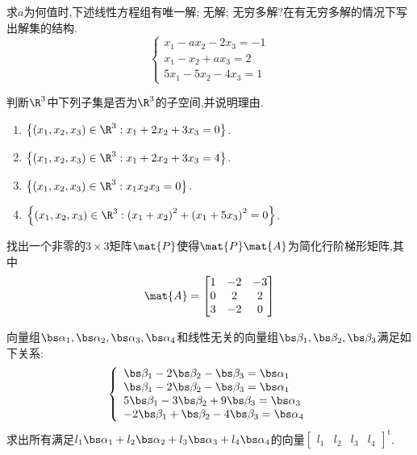 \documentclass{ctexart}
\begin{document}
\pagestyle{empty}
\begin{center}
\end{center}
\begin{homework}[1(20')]
    求$a$为何值时,下述线性方程组有唯一解; 无解; 无穷多解?在有无穷多解的情况下写出解集的结构.
    \[\left\{\begin{array}{l}
        x_1-ax_2-2x_3=-1\\
        x_1-x_2+ax_3=2\\
        5x_1-5x_2-4x_3=1
    \end{array}\right.\]
\end{homework}
\begin{homework}[2(10')]
    判断$\R^3$中下列子集是否为$\R^3$的子空间,并说明理由.
    \begin{enumerate}[label=\tbf{(\arabic*)},topsep=0pt,parsep=0pt,itemsep=0pt,partopsep=0pt]
        \item $\left\{\left(x_1,x_2,x_3\right)\in\R^3:x_1+2x_2+3x_3=0\right\}$.
        \item $\left\{\left(x_1,x_2,x_3\right)\in\R^3:x_1+2x_2+3x_3=4\right\}$.
        \item $\left\{\left(x_1,x_2,x_3\right)\in\R^3:x_1x_2x_3=0\right\}$.
        \item $\left\{\left(x_1,x_2,x_3\right)\in\R^3:\left(x_1+x_2\right)^2+\left(x_1+5x_3\right)^2=0\right\}$.
    \end{enumerate}
\end{homework}
\begin{homework}[3(10')]
    找出一个非零的$3\times3$矩阵$\mat{P}$使得$\mat{P}\mat{A}$为简化行阶梯形矩阵,其中
    \[\mat{A}=\begin{bmatrix}
        1&-2&-3\\
        0&2&2\\
        3&-2&0
    \end{bmatrix}\]
\end{homework}
\begin{homework}[4(20')]
    向量组$\bs\alpha_1,\bs\alpha_2,\bs\alpha_3,\bs\alpha_4$和线性无关的向量组$\bs\beta_1,\bs\beta_2,\bs\beta_3$满足如下关系:
    \[\left\{\begin{array}{l}
        \bs\beta_1-2\bs\beta_2-\bs\beta_3=\bs\alpha_1\\
        \bs\beta_1-2\bs\beta_2-\bs\beta_3=\bs\alpha_1\\
        5\bs\beta_1-3\bs\beta_2+9\bs\beta_3=\bs\alpha_3\\
        -2\bs\beta_1+\bs\beta_2-4\bs\beta_3=\bs\alpha_4\\
    \end{array}\right.\]
    求出所有满足$l_1\bs\alpha_1+l_2\bs\alpha_2+l_3\bs\alpha_3+l_4\bs\alpha_4$的向量$\begin{bmatrix}
        l_1&l_2&l_3&l_4
    \end{bmatrix}^{\text{t}}$.
\end{homework}
\end{document}
